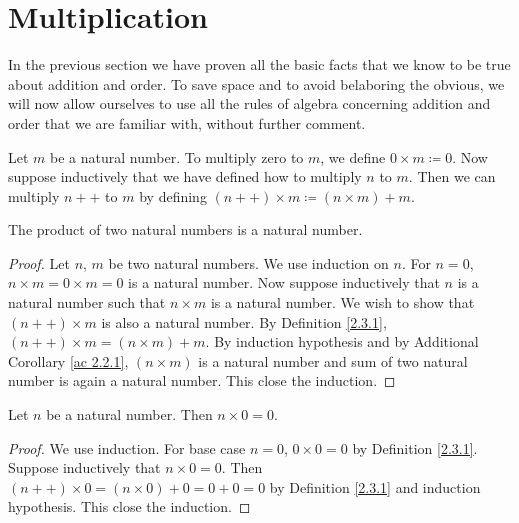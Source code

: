 \section{Multiplication}
\begin{note}
In the previous section we have proven all the basic facts that we know to be true about addition and order.
To save space and to avoid belaboring the obvious, we will now allow ourselves to use all the rules of algebra concerning addition and order that we are familiar with, without further comment.
\end{note}

\begin{definition}\label{2.3.1}
Let \(m\) be a natural number.
To multiply zero to \(m\), we define \(0 \times m \coloneqq 0\).
Now suppose inductively that we have defined how to multiply \(n\) to \(m\).
Then we can multiply \(n++\) to \(m\) by defining \((n++) \times m \coloneqq (n \times m) + m\).
\end{definition}

\begin{additional corollary}\label{ac 2.3.1}
The product of two natural numbers is a natural number.
\end{additional corollary}

\begin{proof}
Let \(n\), \(m\) be two natural numbers.
We use induction on \(n\).
For \(n = 0\), \(n \times m = 0 \times m = 0\) is a natural number.
Now suppose inductively that \(n\) is a natural number such that \(n \times m\) is a natural number.
We wish to show that \((n++) \times m\) is also a natural number.
By Definition \ref{2.3.1}, \((n++) \times m = (n \times m) + m\).
By induction hypothesis and by Additional Corollary \ref{ac 2.2.1}, \((n \times m)\) is a natural number and sum of two natural number is again a natural number.
This close the induction.
\end{proof}

\begin{additional corollary}\label{ac 2.3.2}
Let \(n\) be a natural number.
Then \(n \times 0 = 0\).
\end{additional corollary}

\begin{proof}
We use induction.
For base case \(n = 0\), \(0 \times 0 = 0\) by Definition \ref{2.3.1}.
Suppose inductively that \(n \times 0 = 0\).
Then \((n++) \times 0 = (n \times 0) + 0 = 0 + 0 = 0\) by Definition \ref{2.3.1} and induction hypothesis.
This close the induction.
\end{proof}

